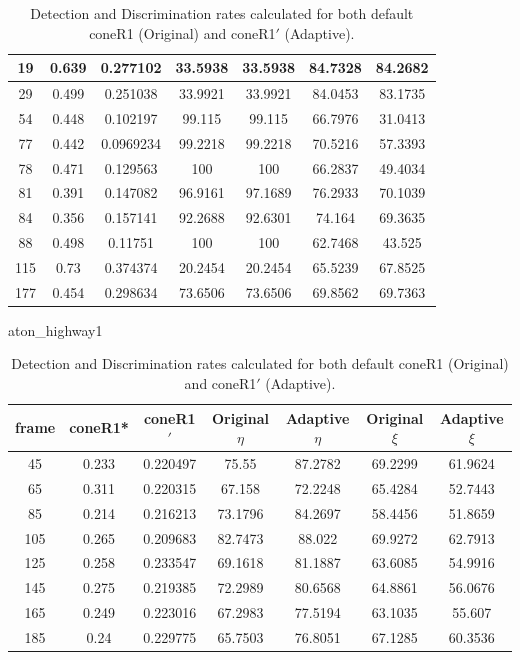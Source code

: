 \begin{appendices}
\begin{table}
\begin{tabular}{ |c|c|c|c|c|c|c| }
\hline
19 &  0.639 &  0.277102 &  33.5938 &  33.5938 &  84.7328 &  84.2682 \\
\hline
29 &  0.499 &  0.251038 &  33.9921 &  33.9921 &  84.0453 &  83.1735 \\
\hline
54 &  0.448 &  0.102197 &  99.115 &  99.115 &  66.7976 &  31.0413 \\
\hline
77 &  0.442 &  0.0969234 &  99.2218 &  99.2218 &  70.5216 &  57.3393 \\
\hline
78 &  0.471 &  0.129563 &  100 &  100 &  66.2837 &  49.4034 \\
\hline
81 &  0.391 &  0.147082 &  96.9161 &  97.1689 &  76.2933 &  70.1039 \\
\hline
84 &  0.356 &  0.157141 &  92.2688 &  92.6301 &  74.164 &  69.3635 \\
\hline
88 &  0.498 &  0.11751 &  100 &  100 &  62.7468 &  43.525 \\
\hline
115 &  0.73 &  0.374374 &  20.2454 &  20.2454 &  65.5239 &  67.8525 \\
\hline
177 &  0.454 &  0.298634 &  73.6506 &  73.6506 &  69.8562 &  69.7363 \\

\hline
\end{tabular}
\caption*{Detection and Discrimination rates calculated for both default coneR1 (Original) and coneR1$'$ (Adaptive).}
\end{table}

\begin{table}
\centering
\caption{aton\_highway1}
\begin{tabular}{ |c|c|c|c|c|c|c| }
\hline
\textbf{frame} &  \textbf{coneR1*} &  \textbf{coneR1$'$} &  \textbf{Original $\eta$} &  \textbf{Adaptive $\eta$} &  \textbf{Original $\xi$} &  \textbf{Adaptive $\xi$} \\
\hline
\hline
45 &  0.233 &  0.220497 &  75.55 &  87.2782 &  69.2299 &  61.9624 \\
\hline
65 &  0.311 &  0.220315 &  67.158 &  72.2248 &  65.4284 &  52.7443 \\
\hline
85 &  0.214 &  0.216213 &  73.1796 &  84.2697 &  58.4456 &  51.8659 \\
\hline
105 &  0.265 &  0.209683 &  82.7473 &  88.022 &  69.9272 &  62.7913 \\
\hline
125 &  0.258 &  0.233547 &  69.1618 &  81.1887 &  63.6085 &  54.9916 \\
\hline
145 &  0.275 &  0.219385 &  72.2989 &  80.6568 &  64.8861 &  56.0676 \\
\hline
165 &  0.249 &  0.223016 &  67.2983 &  77.5194 &  63.1035 &  55.607 \\
\hline
185 &  0.24 &  0.229775 &  65.7503 &  76.8051 &  67.1285 &  60.3536 \\
\hline
\end{tabular}
\caption*{Detection and Discrimination rates calculated for both default coneR1 (Original) and coneR1$'$ (Adaptive).}
\end{table}


\end{appendices}
